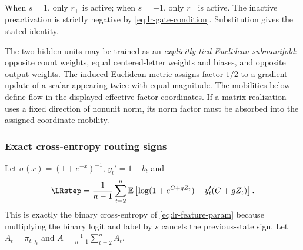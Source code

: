 When $s=1$, only $r_+$ is active; when $s=-1$, only $r_-$ is active.
The inactive preactivation is strictly negative by
\eqref{eq:lr-gate-condition}.  Substitution gives the stated identity.

The two hidden units may be trained as an \emph{explicitly tied Euclidean
submanifold}: opposite count weights, equal centered-letter weights and
biases, and opposite output weights.  The induced Euclidean metric assigns
factor $1/2$ to a gradient update of a scalar appearing twice with equal
magnitude.  The mobilities below define flow in the displayed effective factor coordinates.
If a matrix realization uses a fixed direction of nonunit norm, its norm
factor must be absorbed into the assigned coordinate mobility.

\subsubsection{Exact cross-entropy routing signs}
\label{app:weak-routing-signs}

Let $\sigma(x)=(1+e^{-x})^{-1}$, $y_t'=1-b_t$ and
\begin{equation}\label{eq:lr-logistic-risk}
 \LRstep=\frac1{n-1}\sum_{t=2}^n\mathbb E
 \left[\log(1+e^{C+gZ_t})-y_t'(C+gZ_t)\right].
\end{equation}
This is exactly the binary cross-entropy of
\eqref{eq:lr-feature-param} because multiplying the binary logit and
label by $s$ cancels the previous-state sign.
Let $A_t=\pi_{t,j_t}$ and $\bar A=\frac1{n-1}\sum_{t=2}^n A_t$.

